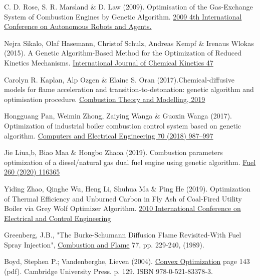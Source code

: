 \documentclass[12pt]{article}
\numberwithin{equation}{section}
\begin{document}
\begin{flushleft}
\begin{thebibliography}{9}
 \label{ga3}
C. D. Rose, S. R. Marsland $\&$ D. Law (2009). Optimisation of the Gas-Exchange System of Combustion Engines by Genetic Algorithm. \href{https://ieeexplore.ieee.org/document/4804021}{2009 4th International Conference on Autonomous Robots and Agents.}


 \label{f1}
Nejra Sikalo, Olaf Hasemann, Christof Schulz, Andreas Kempf $\&$ Irenaus Wlokas (2015). A Genetic Algorithm-Based Method for the Optimization of Reduced Kinetics Mechanisms. \href{https://www.researchgate.net/publication/282270904_A_Genetic_Algorithm-Based_Method_for_the_Optimization_of_Reduced_Kinetics_Mechanisms}{International Journal of Chemical Kinetics 47}


 \label{f2}
Carolyn R. Kaplan, Alp Ozgen $\&$ Elaine S. Oran (2017).Chemical-diffusive models for flame acceleration and
transition-to-detonation: genetic algorithm and optimisation procedure. \href{https://arxiv.org/abs/1709.00096}{Combustion Theory and Modelling, 2019}


 \label{ga4}
Hongguang Pan, Weimin Zhong, Zaiying Wanga $\&$ Guoxin Wanga (2017). Optimization of industrial boiler combustion control system based on genetic algorithm. \href{https://www.sciencedirect.com/science/article/pii/S0045790617325302?via%3Dihub}{Computers and Electrical Engineering 70 (2018) 987–997}


 \label{ga5}
Jie Liua,b, Biao Maa $\&$ Hongbo Zhaoa (2019). Combustion parameters optimization of a diesel/natural gas dual fuel engine using genetic algorithm. \href{https://www.sciencedirect.com/science/article/pii/S0016236119317193?via%3Dihub}{Fuel 260 (2020) 116365}


 \label{ga7}
Yiding Zhao, Qinghe Wu, Heng Li, Shuhua Ma $\&$ Ping He (2019). Optimization of Thermal Efficiency and Unburned Carbon in Fly Ash of Coal-Fired Utility Boiler via Grey Wolf Optimizer Algorithm. \href{https://ieeexplore.ieee.org/document/4804021}{2010 International Conference on Electrical and Control Engineering}


 \label{greenb}
Greenberg, J.B., "The Burke-Schumann Diffusion Flame Revisited-With Fuel Spray Injection", \href{https://www.sciencedirect.com/science/article/abs/pii/0010218089901314}{Combustion and Flame} 77, pp. 229-240, (1989).


 \label{c1}
Boyd, Stephen P.; Vandenberghe, Lieven (2004). \href{https://web.stanford.edu/~boyd/cvxbook/bv_cvxbook.pdf#page=143}{Convex Optimization} page 143 (pdf). Cambridge University Press. p. 129. ISBN 978-0-521-83378-3. 



\end{thebibliography}
\end{flushleft}
\end{document}
